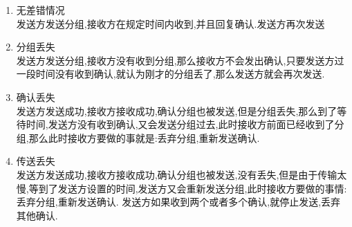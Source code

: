 \documentclass[UTF8,14pt]{article}
\numberwithin{figure}{section}
\begin{document}
\begin{enumerate}
      \setlength{\parskip}{-5mm}
      \item {无差错情况}\\
            发送方发送分组,接收方在规定时间内收到,并且回复确认.发送方再次发送\\
      \item {分组丢失}\\
            发送方发送分组,接收方没有收到分组,那么接收方不会发出确认,只要发送方过一段时间没有收到确认,就认为刚才的分组丢了,那么发送方就会再次发送.\\
      \item {确认丢失}\\
            发送方发送成功,接收方接收成功,确认分组也被发送,但是分组丢失,那么到了等待时间,发送方没有收到确认,又会发送分组过去,此时接收方前面已经收到了分组,那么此时接收方要做的事就是:丢弃分组,重新发送确认.\\
      \item {传送丢失}\\
            发送方发送成功,接收方接收成功,确认分组也被发送,没有丢失,但是由于传输太慢,等到了发送方设置的时间,发送方又会重新发送分组,此时接收方要做的事情:丢弃分组,重新发送确认. 发送方如果收到两个或者多个确认,就停止发送,丢弃其他确认.
\end{enumerate}
\vspace*{-0.5cm}
\end{document}
